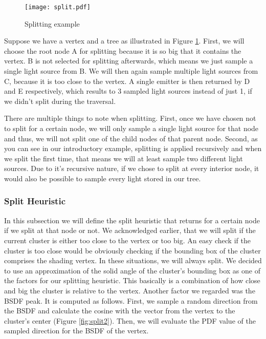 \begin{figure}
	\begin{center}
		\texttt{[image: split.pdf]}
		\caption{Splitting example}
		\label{fig:split}
	\end{center}
\end{figure}

Suppose we have a vertex and a tree as illustrated in Figure \ref{fig:split}. First, we will choose the root node A for splitting because it is so big that it contains the vertex. B is not selected for splitting afterwards, which means we just sample a single light source from B. We will then again sample multiple light sources from C, because it is too close to the vertex. A single emitter is then returned by D and E respectively, which results to 3 sampled light sources instead of just 1, if we didn't split during the traversal. 

There are multiple things to note when splitting. First, once we have chosen not to split for a certain node, we will only sample a single light source for that node and thus, we will not split one of the child nodes of that parent node. Second, as you can see in our introductory example, splitting is applied recursively and when we split the first time, that means we will at least sample two different light sources. Due to it's recursive nature, if we chose to split at every interior node, it would also be possible to sample every light stored in our tree.

\subsubsection{Split Heuristic}

In this subsection we will define the split heuristic that returns for a certain node if we split at that node or not. We acknowledged earlier, that we will split if the current cluster is either too close to the vertex or too big. An easy check if the cluster is too close would be obviously checking if the bounding box of the cluster comprises the shading vertex. In these situations, we will always split. We decided to use an approximation of the solid angle of the cluster's bounding box as one of the factors for our splitting heuristic. This basically is a combination of how close and big the cluster is relative to the vertex. Another factor we regarded was the BSDF peak. It is computed as follows. First, we sample a random direction from the BSDF and calculate the cosine with the vector from the vertex to the cluster's center (Figure \ref{fig:split2}). Then, we will evaluate the PDF value of the sampled direction for the BSDF of the vertex.


